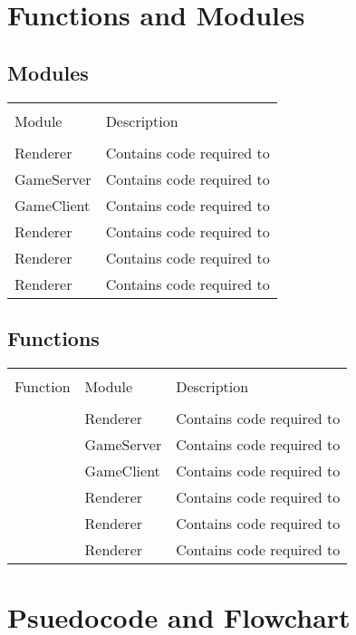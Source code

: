 \documentclass[12pt, DIV=calc]{scrartcl}
\begin{document}
\section{Functions and Modules}
\subsection{Modules}
\begin{xltabular}[c]{\textwidth}{| X | X |}
    \hline \\
Module & Description \\
    \hline \hline \\
Renderer & Contains code required to  \\ \hline
GameServer & Contains code required to  \\ \hline
GameClient & Contains code required to  \\ \hline
Renderer & Contains code required to  \\ \hline
Renderer & Contains code required to  \\ \hline
Renderer & Contains code required to  \\ \hline
\end{xltabular}

\subsection{Functions}
\begin{xltabular}[c]{\textwidth}{| X | X | X |}
    \hline \\
Function & Module & Description \\
    \hline \hline \\
 & Renderer & Contains code required to  \\ \hline
 & GameServer & Contains code required to  \\ \hline
 & GameClient & Contains code required to  \\ \hline
 & Renderer & Contains code required to  \\ \hline
 & Renderer & Contains code required to  \\ \hline
 & Renderer & Contains code required to  \\ \hline
\end{xltabular}


\section{Psuedocode and Flowchart}
\end{document}

